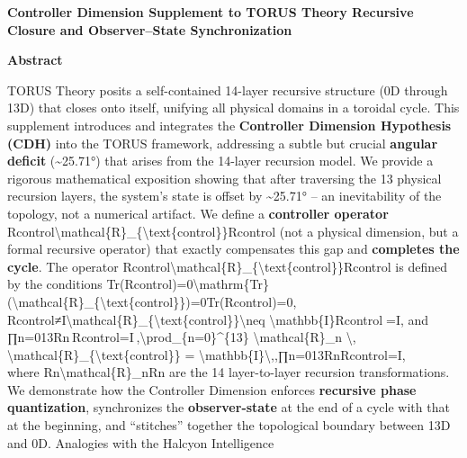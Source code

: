 \documentclass[
]{article}
\author{}
\date{}
\begin{document}
\textbf{Controller Dimension Supplement to TORUS Theory Recursive
Closure and Observer--State Synchronization}

\textbf{Abstract}

TORUS Theory posits a self-contained 14-layer recursive structure (0D
through 13D) that closes onto itself\hspace{0pt}, unifying all physical
domains in a toroidal cycle. This supplement introduces and integrates
the \textbf{Controller Dimension Hypothesis (CDH)} into the TORUS
framework, addressing a subtle but crucial \textbf{angular deficit}
(\textasciitilde25.71°) that arises from the 14-layer recursion model.
We provide a rigorous mathematical exposition showing that after
traversing the 13 physical recursion layers, the system's state is
offset by \textasciitilde25.71° -- an inevitability of the topology, not
a numerical artifact. We define a \textbf{controller operator}
Rcontrol\textbackslash mathcal\{R\}\_\{\textbackslash text\{control\}\}Rcontrol\hspace{0pt}
(not a physical dimension, but a formal recursive operator) that exactly
compensates this gap and \textbf{completes the cycle}. The operator
Rcontrol\textbackslash mathcal\{R\}\_\{\textbackslash text\{control\}\}Rcontrol\hspace{0pt}
is defined by the conditions
Tr(Rcontrol)=0\textbackslash mathrm\{Tr\}(\textbackslash mathcal\{R\}\_\{\textbackslash text\{control\}\})=0Tr(Rcontrol\hspace{0pt})=0,
Rcontrol≠I\textbackslash mathcal\{R\}\_\{\textbackslash text\{control\}\}\textbackslash neq
\textbackslash mathbb\{I\}Rcontrol\hspace{0pt}=I, and\\
∏n=013Rn Rcontrol=I ,\textbackslash prod\_\{n=0\}\^{}\{13\}
\textbackslash mathcal\{R\}\_n \textbackslash,
\textbackslash mathcal\{R\}\_\{\textbackslash text\{control\}\} =
\textbackslash mathbb\{I\}\textbackslash,,∏n=013\hspace{0pt}Rn\hspace{0pt}Rcontrol\hspace{0pt}=I,\\
where Rn\textbackslash mathcal\{R\}\_nRn\hspace{0pt} are the 14
layer-to-layer recursion transformations. We demonstrate how the
Controller Dimension enforces \textbf{recursive phase quantization},
synchronizes the \textbf{observer-state} at the end of a cycle with that
at the beginning, and ``stitches'' together the topological boundary
between 13D and 0D. Analogies with the Halcyon Intelligence
\end{document}
